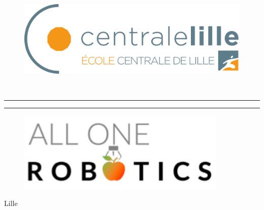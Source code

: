 \begin{titlepage}

\newcommand{\HRule}{\rule{\linewidth}{0.5mm}} 

\center 

\begin{figure}
\centerline{\includegraphics[width=12cm]{Images/Centrale_logo.png}}
\end{figure}

\vspace{3.0cm}


\textsc{\Large \MyClass}\\ 

\vspace{0.5cm}


\hrule
\vspace{0.4cm}
\hfill{\huge \bfseries \MyTitle}\hfill
\vspace{0.4cm}
\hrule

\vspace{1.5cm}

\MyAuthor

\vfill
\begin{figure}[H]
\centerline{\includegraphics[width=10cm]{Images/AllOneRobotics_logo.png}}
\end{figure}

\vfill

\flushleft
Lille

\end{titlepage}
